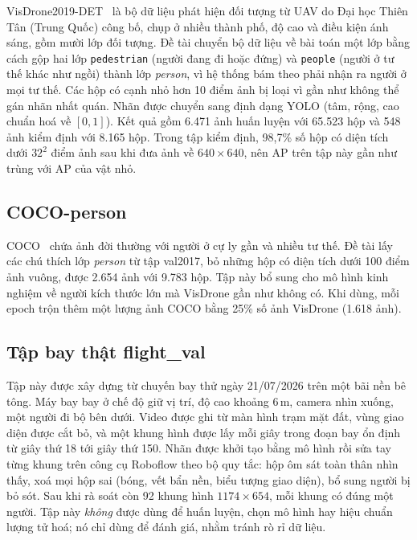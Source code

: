 VisDrone2019-DET~\cite{zhu2022visdrone} là bộ dữ liệu phát hiện đối tượng từ UAV do Đại học Thiên Tân (Trung Quốc) công bố, chụp ở nhiều thành phố, độ cao và điều kiện ánh sáng, gồm mười lớp đối tượng. Đề tài chuyển bộ dữ liệu về bài toán một lớp bằng cách gộp hai lớp \texttt{pedestrian} (người đang đi hoặc đứng) và \texttt{people} (người ở tư thế khác như ngồi) thành lớp \textit{person}, vì hệ thống bám theo phải nhận ra người ở mọi tư thế. Các hộp có cạnh nhỏ hơn 10 điểm ảnh bị loại vì gần như không thể gán nhãn nhất quán. Nhãn được chuyển sang định dạng YOLO (tâm, rộng, cao chuẩn hoá về $[0,1]$). Kết quả gồm 6.471 ảnh huấn luyện với 65.523 hộp và 548 ảnh kiểm định với 8.165 hộp. Trong tập kiểm định, 98,7\% số hộp có diện tích dưới $32^2$ điểm ảnh sau khi đưa ảnh về $640\times640$, nên AP trên tập này gần như trùng với AP của vật nhỏ.

\subsection{COCO-person}

COCO~\cite{lin2014coco} chứa ảnh đời thường với người ở cự ly gần và nhiều tư thế. Đề tài lấy các chú thích lớp \textit{person} từ tập val2017, bỏ những hộp có diện tích dưới 100 điểm ảnh vuông, được 2.654 ảnh với 9.783 hộp. Tập này bổ sung cho mô hình kinh nghiệm về người kích thước lớn mà VisDrone gần như không có. Khi dùng, mỗi epoch trộn thêm một lượng ảnh COCO bằng 25\% số ảnh VisDrone (1.618 ảnh).

\subsection{Tập bay thật flight\_val}

Tập này được xây dựng từ chuyến bay thử ngày 21/07/2026 trên một bãi nền bê tông. Máy bay bay ở chế độ giữ vị trí, độ cao khoảng 6\,m, camera nhìn xuống, một người đi bộ bên dưới. Video được ghi từ màn hình trạm mặt đất, vùng giao diện được cắt bỏ, và một khung hình được lấy mỗi giây trong đoạn bay ổn định từ giây thứ 18 tới giây thứ 150. Nhãn được khởi tạo bằng mô hình rồi sửa tay từng khung trên công cụ Roboflow theo bộ quy tắc: hộp ôm sát toàn thân nhìn thấy, xoá mọi hộp sai (bóng, vết bẩn nền, biểu tượng giao diện), bổ sung người bị bỏ sót. Sau khi rà soát còn 92 khung hình $1174\times654$, mỗi khung có đúng một người. Tập này \textit{không} được dùng để huấn luyện, chọn mô hình hay hiệu chuẩn lượng tử hoá; nó chỉ dùng để đánh giá, nhằm tránh rò rỉ dữ liệu.

